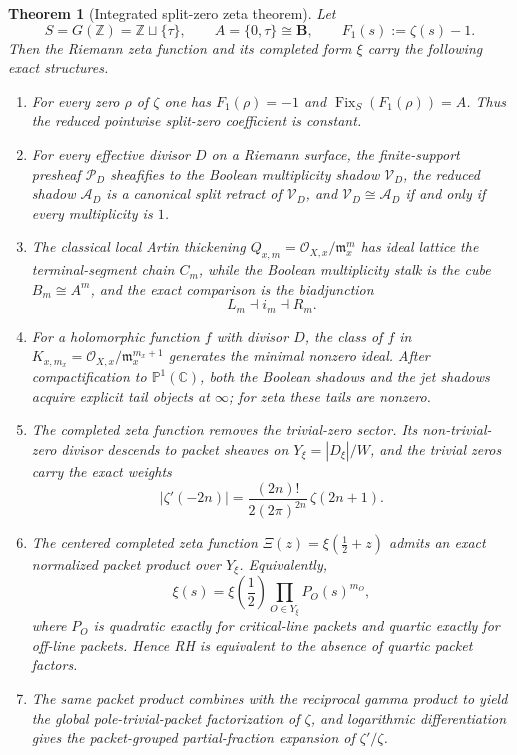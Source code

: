 \documentclass[11pt,a4paper]{article}
\numberwithin{equation}{section}
\newtheorem{theorem}{Theorem}[section]
\theoremstyle{definition}
\theoremstyle{remark}
\DeclareMathOperator{\Fix}{Fix}
\newcommand{\ZZ}{\mathbb Z}
\newcommand{\CC}{\mathbb C}
\newcommand{\PP}{\mathbb P}
\newcommand{\BB}{\mathbf B}
\newcommand{\cO}{\mathcal O}
\newcommand{\cP}{\mathcal P}
\newcommand{\cV}{\mathcal V}
\newcommand{\cA}{\mathcal A}
\newcommand{\taup}{\tau}
\begin{document}
\begin{theorem}[Integrated split-zero zeta theorem]\label{thm:integrated-final}
Let
\[
S=G(\ZZ)=\ZZ\sqcup\{\taup\},
\qquad
A=\{0,\taup\}\cong \BB,
\qquad
F_1(s):=\zeta(s)-1.
\]
Then the Riemann zeta function and its completed form $\xi$ carry the following exact structures.

\begin{enumerate}[label=(\roman*)]
\item For every zero $\rho$ of $\zeta$ one has $F_1(\rho)=-1$ and $\Fix_S(F_1(\rho))=A$.  Thus the reduced pointwise split-zero coefficient is constant.
\item For every effective divisor $D$ on a Riemann surface, the finite-support presheaf $\cP_D$ sheafifies to the Boolean multiplicity shadow $\cV_D$, the reduced shadow $\cA_D$ is a canonical split retract of $\cV_D$, and $\cV_D\cong \cA_D$ if and only if every multiplicity is $1$.
\item The classical local Artin thickening $Q_{x,m}=\cO_{X,x}/\mathfrak m_x^m$ has ideal lattice the terminal-segment chain $C_m$, while the Boolean multiplicity stalk is the cube $B_m\cong A^m$, and the exact comparison is the biadjunction
\[
L_m\dashv i_m\dashv R_m.
\]
\item For a holomorphic function $f$ with divisor $D$, the class of $f$ in $K_{x,m_x}=\cO_{X,x}/\mathfrak m_x^{m_x+1}$ generates the minimal nonzero ideal.  After compactification to $\PP^1(\CC)$, both the Boolean shadows and the jet shadows acquire explicit tail objects at $\infty$; for zeta these tails are nonzero.
\item The completed zeta function removes the trivial-zero sector.  Its non-trivial-zero divisor descends to packet sheaves on $Y_\xi=|D_\xi|/W$, and the trivial zeros carry the exact weights
\[
|\zeta'(-2n)|=\frac{(2n)!}{2(2\pi)^{2n}}\,\zeta(2n+1).
\]
\item The centered completed zeta function $\Xi(z)=\xi(\tfrac12+z)$ admits an exact normalized packet product over $Y_\xi$.  Equivalently,
\[
\xi(s)=\xi\!\left(\frac12\right)\prod_{O\in Y_\xi}P_O(s)^{m_O},
\]
where $P_O$ is quadratic exactly for critical-line packets and quartic exactly for off-line packets.  Hence RH is equivalent to the absence of quartic packet factors.
\item The same packet product combines with the reciprocal gamma product to yield the global pole-trivial-packet factorization of $\zeta$, and logarithmic differentiation gives the packet-grouped partial-fraction expansion of $\zeta'/\zeta$.

\end{enumerate}
\end{theorem}
\end{document}

